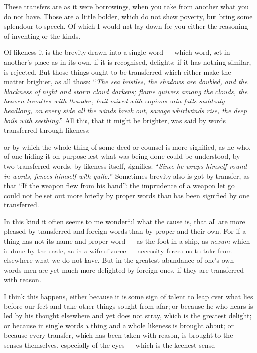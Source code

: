  These transfers are as it were borrowings, when you take from another what you do not have. Those are a little bolder, which do not show poverty, but bring some splendour to speech. Of which I would not lay down for you either the reasoning of inventing or the kinds.

 Of likeness it is the brevity drawn into a single word — which word, set in another's place as in its own, if it is recognised, delights; if it has nothing similar, is rejected. But those things ought to be transferred which either make the matter brighter, as all those: ``\textit{The sea bristles, the shadows are doubled, and the blackness of night and storm cloud darkens; flame quivers among the clouds, the heaven trembles with thunder, hail mixed with copious rain falls suddenly headlong, on every side all the winds break out, savage whirlwinds rise, the deep boils with seething}.'' All this, that it might be brighter, was said by words transferred through likeness;

 or by which the whole thing of some deed or counsel is more signified, as he who, of one hiding it on purpose lest what was being done could be understood, by two transferred words, by likeness itself, signifies: ``\textit{Since he wraps himself round in words, fences himself with guile.}'' Sometimes brevity also is got by transfer, as that ``If the weapon flew from his hand'': the imprudence of a weapon let go could not be set out more briefly by proper words than has been signified by one transferred.

 In this kind it often seems to me wonderful what the cause is, that all are more pleased by transferred and foreign words than by proper and their own. For if a thing has not its name and proper word — as the foot in a ship, as \textit{nexum} which is done by the scale, as in a wife divorce — necessity forces us to take from elsewhere what we do not have. But in the greatest abundance of one's own words men are yet much more delighted by foreign ones, if they are transferred with reason.

 I think this happens, either because it is some sign of talent to leap over what lies before our feet and take other things sought from afar; or because he who hears is led by his thought elsewhere and yet does not stray, which is the greatest delight; or because in single words a thing and a whole likeness is brought about; or because every transfer, which has been taken with reason, is brought to the senses themselves, especially of the eyes — which is the keenest sense.

